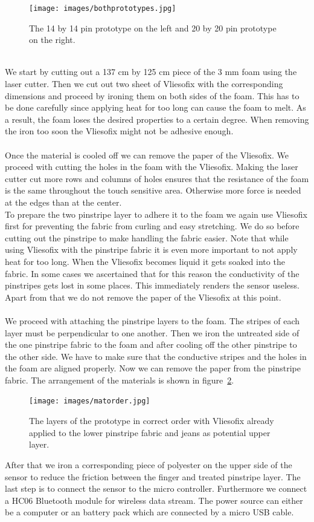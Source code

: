 \begin{figure}
\texttt{[image: images/bothprototypes.jpg]}
\caption{The 14 by 14 pin prototype on the left and 20 by 20 pin prototype on the right.}
\label{fig:bothprototypes}
\end{figure}
\\
We start by cutting out a 137 cm by 125 cm piece of the 3 mm foam using the laser cutter. Then we cut out two sheet of Vliesofix with the corresponding dimensions and proceed by ironing them on both sides of the foam. This has to be done carefully since applying heat for too long can cause the foam to melt. As a result, the foam loses the desired properties to a certain degree. When removing the iron too soon the Vliesofix might not be adhesive enough. 
\\ \\
Once the material is cooled off we can remove the paper of the Vliesofix. We proceed with cutting the holes in the foam with the Vliesofix. Making the laser cutter cut more rows and columns of holes ensures that the resistance of the foam is the same throughout the touch sensitive area. Otherwise more force is needed at the edges than at the center. 
\\
To prepare the two pinstripe layer to adhere it to the foam we again use Vliesofix first for preventing the fabric from curling and easy stretching. We do so before cutting out the pinstripe to make handling the fabric easier. Note that while using Vliesofix with the pinstripe fabric it is even more important to not apply heat for too long. When the Vliesofix becomes liquid it gets soaked into the fabric. In some cases we ascertained that for this reason the conductivity of the pinstripes gets lost in some places. This immediately renders the sensor useless. Apart from that we do not remove the paper of the Vliesofix at this point.
\\ \\
We proceed with attaching the pinstripe layers to the foam. The stripes of each layer must be perpendicular to one another. Then we iron the untreated side of the  one pinstripe fabric to the foam and after cooling off the other pinstripe to the other side.  We have to make sure that the conductive stripes and the holes in the foam are aligned properly. Now we can remove the paper from the pinstripe fabric. The arrangement of the materials is shown in figure~\ref{fig:matorder}.\\
\begin{figure}
\texttt{[image: images/matorder.jpg]}
\caption{The layers of the prototype in correct order with Vliesofix already applied to the lower pinstripe fabric and jeans as potential upper layer.}
\label{fig:matorder}
\end{figure}
After that we iron a corresponding piece of polyester on the upper side of the sensor to reduce the friction between the finger and treated pinstripe layer. The last step is to connect the sensor to the micro controller. Furthermore we connect a HC06  Bluetooth module for wireless data stream. The power source can either be a computer or an battery pack which are connected by a micro USB cable.
 
